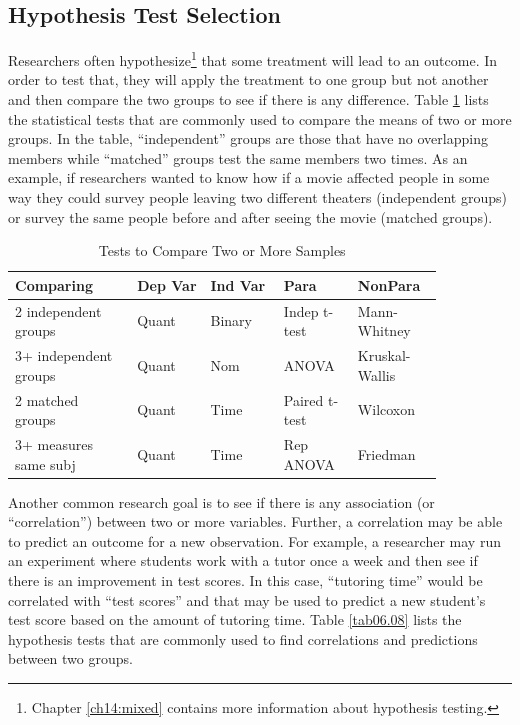 \subsection{Hypothesis Test Selection}

Researchers often hypothesize\footnote{Chapter \ref{ch14:mixed} contains more information about hypothesis testing.} that some treatment will lead to an outcome. In order to test that, they will apply the treatment to one group but not another and then compare the two groups to see if there is any difference. Table \ref{tab06.07} lists the statistical tests that are commonly used to compare the means of two or more groups. In the table, ``independent'' groups are those that have no overlapping members while ``matched'' groups test the same members two times. As an example, if researchers wanted to know how if a movie affected people in some way they could survey people leaving two different theaters (independent groups) or survey the same people before and after seeing the movie (matched groups).

\begin{table}[H]
	\centering
	\begin{tabularx}{0.95\linewidth}{p{0.25\linewidth}
			p{0.15\linewidth}
			p{0.15\linewidth}
			p{0.15\linewidth}
			p{0.15\linewidth}
		}
		\toprule
		\textbf{Comparing} & 
			\textbf{Dep Var} & 
			\textbf{Ind Var} &
			\textbf{Para} & 
			\textbf{NonPara} \\
		\midrule
		2 independent \newline groups & Quant & Binary & Indep t-test & Mann-Whitney \\
		3+ independent \newline groups & Quant & Nom & ANOVA & Kruskal-Wallis \\
		2 matched \newline groups & Quant & Time & Paired t-test & Wilcoxon \\	
		3+ measures \newline same subj & Quant & Time & Rep ANOVA & Friedman \\		

		\bottomrule
	\end{tabularx}
	\caption{Tests to Compare Two or More Samples}
	\label{tab06.07}
\end{table}

Another common research goal is to see if there is any association (or ``correlation'') between two or more variables. Further, a correlation may be able to predict an outcome for a new observation. For example, a researcher may run an experiment where students work with a tutor once a week and then see if there is an improvement in test scores. In this case, ``tutoring time'' would be correlated with ``test scores'' and that may be used to predict a new student's test score based on the amount of tutoring time. Table \ref{tab06.08} lists the hypothesis tests that are commonly used to find correlations and predictions between two groups.

